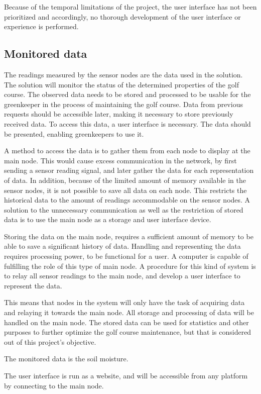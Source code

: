 
Because of the temporal limitations of the project, the user interface has not been prioritized and accordingly, no thorough development of the user interface or experience is performed. 


\subsection{Monitored data}
The readings measured by the sensor nodes are the data used in the solution. The solution will monitor the status of the determined properties of the golf course. The observed data needs to be stored and processed to be usable for the greenkeeper in the process of maintaining the golf course. Data from previous requests should be accessible later, making it necessary to store previously received data. To access this data, a user interface is necessary. The data should be presented, enabling greenkeepers to use it.%

A method to access the data is to gather them from each node to display at the main node. This would cause excess communication in the network, by first sending a sensor reading signal, and later gather the data for each representation of data. In addition, because of the limited amount of memory available in the sensor nodes, it is not possible to save all data on each node. This restricts the historical data to the amount of readings accommodable on the sensor nodes. A solution to the unnecessary communication as well as the restriction of stored data is to use the main node as a storage and user interface device.

Storing the data on the main node, requires a sufficient amount of memory to be able to save a significant history of data. Handling and representing the data requires processing power, to be functional for a user. A computer is capable of fulfilling the role of this type of main node. A procedure for this kind of system is to relay all sensor readings to the main node, and develop a user interface to represent the data. 

This means that nodes in the system will only have the task of acquiring data and relaying it towards the main node. All storage and processing of data will be handled on the main node.
The stored data can be used for statistics and other purposes to further optimize the golf course maintenance, but that is considered out of this project's objective.


The monitored data is the soil moisture.


The user interface is run as a website, and will be accessible from any platform by connecting to the main node.

